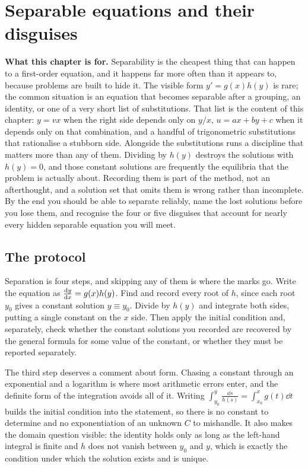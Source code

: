 \chapter{Separable equations and their disguises}

\begin{orient}
\textbf{What this chapter is for.} Separability is the cheapest thing that can happen to a first-order equation, and it happens far more often than it appears to, because problems are built to hide it. The visible form $y'=g(x)h(y)$ is rare; the common situation is an equation that becomes separable after a grouping, an identity, or one of a very short list of substitutions. That list is the content of this chapter: $y=vx$ when the right side depends only on $y/x$, $u=ax+by+c$ when it depends only on that combination, and a handful of trigonometric substitutions that rationalise a stubborn side. Alongside the substitutions runs a discipline that matters more than any of them. Dividing by $h(y)$ destroys the solutions with $h(y)=0$, and those constant solutions are frequently the equilibria that the problem is actually about. Recording them is part of the method, not an afterthought, and a solution set that omits them is wrong rather than incomplete. By the end you should be able to separate reliably, name the lost solutions before you lose them, and recognise the four or five disguises that account for nearly every hidden separable equation you will meet.
\end{orient}

\section{The protocol}

Separation is four steps, and skipping any of them is where the marks go. Write the equation as $\frac{\mathrm{d}y}{\mathrm{d}x}=g(x)h(y)$. Find and record every root of $h$, since each root $y_0$ gives a constant solution $y\equiv y_0$. Divide by $h(y)$ and integrate both sides, putting a single constant on the $x$ side. Then apply the initial condition and, separately, check whether the constant solutions you recorded are recovered by the general formula for some value of the constant, or whether they must be reported separately.

The third step deserves a comment about form. Chasing a constant through an exponential and a logarithm is where most arithmetic errors enter, and the definite form of the integration avoids all of it. Writing $\displaystyle\int_{y_0}^{y}\frac{\dd s}{h(s)}=\int_{x_0}^{x}g(t)\dd t$ builds the initial condition into the statement, so there is no constant to determine and no exponentiation of an unknown $C$ to mishandle. It also makes the domain question visible: the identity holds only as long as the left-hand integral is finite and $h$ does not vanish between $y_0$ and $y$, which is exactly the condition under which the solution exists and is unique.

